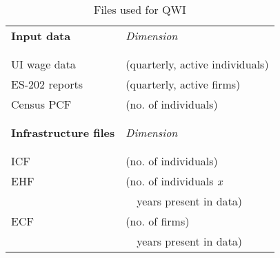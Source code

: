 
\begin{table}[htbp]
\begin{center}
  \caption{Files used for QWI}
  \label{tab:files_QWI}
  \begin{tabular}{lp{2in}}
{\bf Input data} &\it Dimension \\

\\[-.3cm]
\hline
\\[-.3cm]
UI wage data  &(quarterly, active individuals)\\
ES-202 reports&(quarterly, active firms)\\
Census PCF    &(no. of individuals)\\
\\
\\
\multicolumn{1}{l}{\bf Infrastructure files}&\it Dimension\\

\\[-.3cm]
\hline
\\[-.3cm]
ICF &(no. of individuals) \\
EHF &(no. of individuals {\it x}\\
    &\ \ years present in data)\\
ECF &(no. of firms)\\
    &\ \ years present in data)\\
  \end{tabular}
\end{center}
\end{table}
